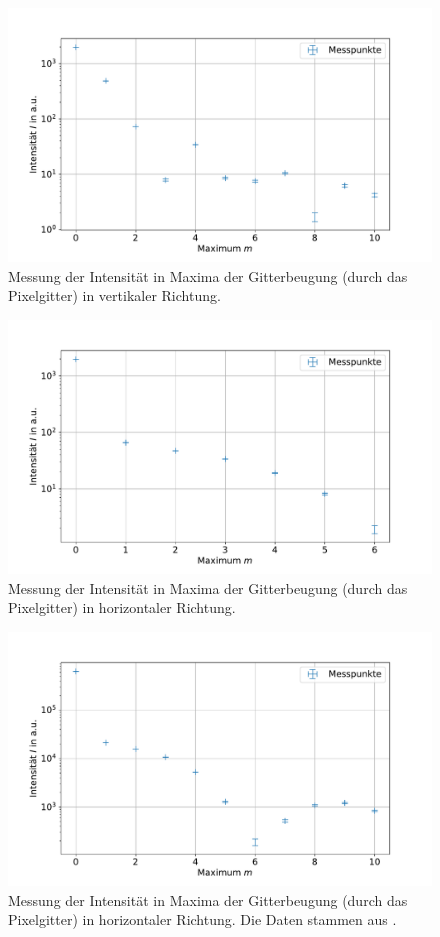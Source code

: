 \documentclass[
	a4paper,
	12pt,
	pagesize,
	ngerman
]{scrartcl}
\begin{document}
\begin{figure}[H]
			\includegraphics[width=0.8\linewidth]{img/sinc1}
			\caption{
			Messung der Intensität in Maxima der Gitterbeugung (durch das Pixelgitter) in vertikaler Richtung.
			}
			\label{fig_sinc1}
	\end{figure}

\begin{figure}[H] %
			\includegraphics[width=0.8\linewidth]{img/sinc2}
			\caption{
			Messung der Intensität in Maxima der Gitterbeugung (durch das Pixelgitter) in horizontaler Richtung.
			}
			\label{fig_sinc2}
	\end{figure}

\begin{figure}[H] %
			\includegraphics[width=0.8\linewidth]{img/sinc3}
			\caption{
			Messung der Intensität in Maxima der Gitterbeugung (durch das Pixelgitter) in horizontaler Richtung.
			Die Daten stammen aus \cite{JTZ}.
			}
			\label{fig_sinc3}
	\end{figure}
\end{document}
